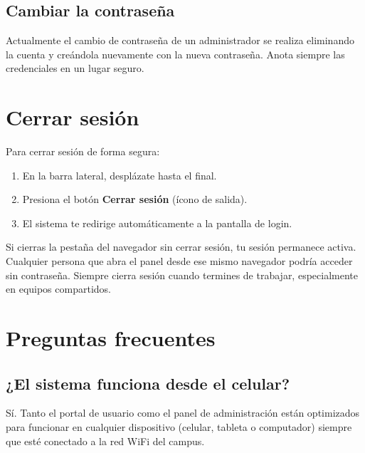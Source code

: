 \documentclass[12pt, a4paper]{article}
\begin{document}
\subsection{Cambiar la contraseña}

Actualmente el cambio de contraseña de un administrador se realiza
eliminando la cuenta y creándola nuevamente con la nueva contraseña.
Anota siempre las credenciales en un lugar seguro.

\section{Cerrar sesión}

Para cerrar sesión de forma segura:

\begin{enumerate}
  \item En la barra lateral, desplázate hasta el final.
  \item Presiona el botón \textbf{Cerrar sesión} (ícono de salida).
  \item El sistema te redirige automáticamente a la pantalla de login.
\end{enumerate}

\begin{aviso}
  Si cierras la pestaña del navegador sin cerrar sesión, tu sesión
  permanece activa. Cualquier persona que abra el panel desde ese mismo
  navegador podría acceder sin contraseña. Siempre cierra sesión cuando
  termines de trabajar, especialmente en equipos compartidos.
\end{aviso}

\section{Preguntas frecuentes}

\subsection*{¿El sistema funciona desde el celular?}

Sí. Tanto el portal de usuario como el panel de administración están
optimizados para funcionar en cualquier dispositivo (celular, tableta
o computador) siempre que esté conectado a la red WiFi del campus.
\end{document}
